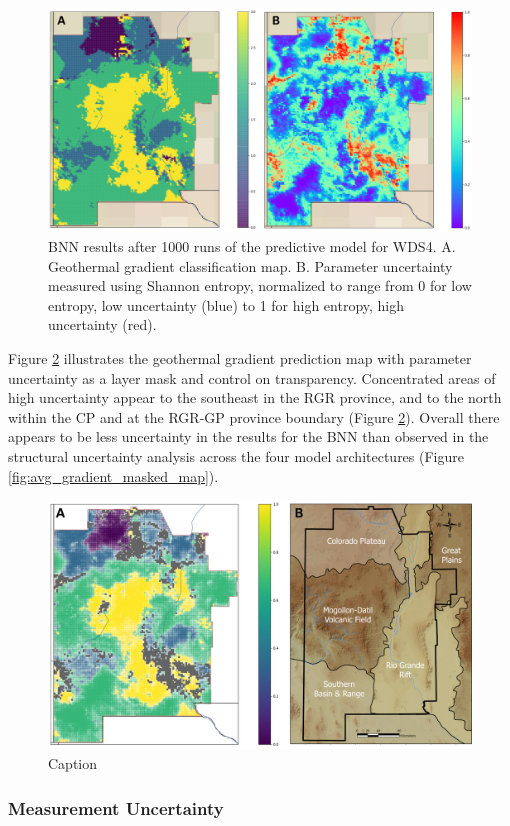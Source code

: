 \begin{figure}[!htp]
\centering
\includegraphics[width=\textwidth]{templates/images/Figure-BNN_MeanGrad_Entropy_PairMap.png}
\caption[BNN prediction and entropy maps]{BNN results after 1000 runs of the predictive model for WDS4. A. Geothermal gradient classification map. B. Parameter uncertainty measured using Shannon entropy, normalized to range from 0 for low entropy, low uncertainty (blue) to 1 for high entropy, high uncertainty (red).}
\label{fig:bnn_pred_entropy_maps}
\end{figure}

Figure \ref{fig:bnn_masked_pred_map} illustrates the geothermal gradient prediction map with parameter uncertainty as a layer mask and control on transparency. Concentrated areas of high uncertainty appear to the southeast in the RGR province, and to the north within the CP and at the RGR-GP province boundary (Figure \ref{fig:bnn_masked_pred_map}). Overall there appears to be less uncertainty in the results for the BNN than observed in the structural uncertainty analysis across the four model architectures (Figure \ref{fig:avg_gradient_masked_map}).  

\begin{figure}[!htp]
\centering
\includegraphics[width=\textwidth]{templates/images/Figure-BNN_Entropy_Province_PairMap.png}
\caption[Parameter uncertainty mask on BNN prediction map]{Caption}
\label{fig:bnn_masked_pred_map}
\end{figure}

\subsubsection{Measurement Uncertainty}
